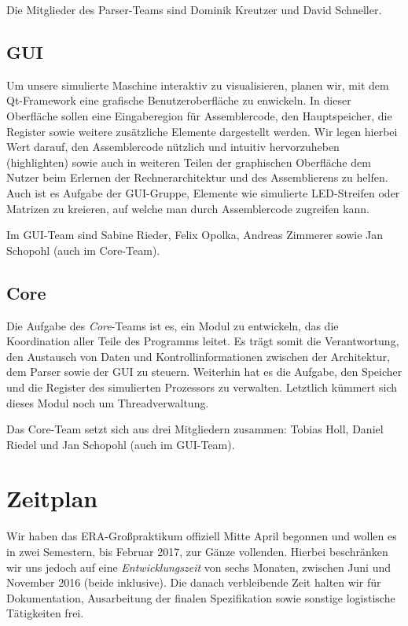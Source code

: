 Die Mitglieder des Parser-Teams sind Dominik Kreutzer und David Schneller.

\subsection{GUI}

Um unsere simulierte Maschine interaktiv zu visualisieren, planen wir, mit dem
Qt-Framework eine grafische Benutzeroberfläche zu enwickeln. In dieser
Oberfläche sollen eine Eingaberegion für Assemblercode, den Hauptspeicher, die
Register sowie weitere zusätzliche Elemente dargestellt werden. Wir legen
hierbei Wert darauf, den Assemblercode nützlich und intuitiv hervorzuheben
(highlighten) sowie auch in weiteren Teilen der graphischen Oberfläche dem
Nutzer beim Erlernen der Rechnerarchitektur und des Assemblierens zu
helfen. Auch ist es Aufgabe der GUI-Gruppe, Elemente wie simulierte LED-Streifen
oder Matrizen zu kreieren, auf welche man durch Assemblercode zugreifen
kann.

Im GUI-Team sind Sabine Rieder, Felix Opolka, Andreas Zimmerer sowie Jan
Schopohl (auch im Core-Team).

\subsection{Core}

Die Aufgabe des \emph{Core}-Teams ist es, ein Modul zu entwickeln, das die
Koordination aller Teile des Programms leitet. Es trägt somit die Verantwortung,
den Austausch von Daten und Kontrollinformationen zwischen der Architektur, dem
Parser sowie der GUI zu steuern. Weiterhin hat es die Aufgabe, den Speicher und
die Register des simulierten Prozessors zu verwalten. Letztlich kümmert sich
dieses Modul noch um Threadverwaltung.

Das Core-Team setzt sich aus drei Mitgliedern zusammen: Tobias Holl, Daniel
Riedel und Jan Schopohl (auch im GUI-Team).

\section{Zeitplan}

Wir haben das ERA-Großpraktikum offiziell Mitte April begonnen und wollen es in
zwei Semestern, bis Februar 2017, zur Gänze vollenden. Hierbei beschränken wir
uns jedoch auf eine \emph{Entwicklungszeit} von sechs Monaten, zwischen Juni und
November 2016 (beide inklusive). Die danach verbleibende Zeit halten wir für
Dokumentation, Ausarbeitung der finalen Spezifikation sowie sonstige
logistische Tätigkeiten frei.

